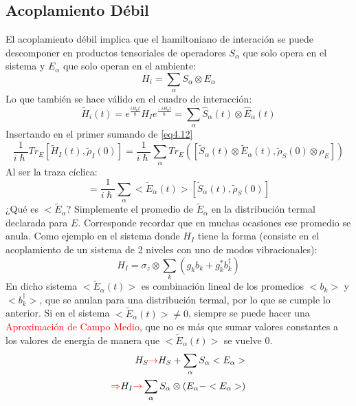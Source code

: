 \documentclass{book}
\begin{document}
\subsection{Acoplamiento Débil} 
El acoplamiento débil implica que el hamiltoniano de interación se puede descomponer en productos tensoriales de operadores $S_\alpha$ que solo opera en el sistema y $E_\alpha$ que solo operan en el ambiente:
\begin{equation}\label{eq4.13}H_i=\sum_\alpha S_\alpha\otimes E_\alpha\end{equation}
Lo que también se hace válido en el cuadro de interacción:
\begin{equation}\label{eq4.14}\tilde{H}_i(t)=e^{\frac{iH_0t}{\hslash}}H_Ie^{\frac{-iH_0t}{\hslash}}=\sum_\alpha \hat{S}_\alpha (t)\otimes \hat{E}_\alpha(t) \end{equation}
Insertando en el primer sumando de \ref{eq4.12} 
\begin{equation}\label{eq4.15}\frac{1}{i\hslash}Tr_E[\tilde{H}_I(t),\tilde{\rho}_I(0)]=\frac{1}{i\hslash}\sum_\alpha Tr_E ([\tilde{S}_\alpha(t)\otimes\tilde{E}_\alpha(t),\tilde{\rho}_S(0)\otimes\rho_E])\end{equation}
Al ser la traza cíclica:
\begin{equation}\label{eq4.16}=\frac{1}{i\hslash}
\sum_\alpha <\tilde{E}_\alpha(t)>[\tilde{S}_\alpha(t),\tilde{\rho}_S(0)]\end{equation}
¿Qué es $<\tilde{E}_\alpha$? Simplemente el promedio de $\tilde{E}_\alpha$ en la distribución termal declarada para $E$. Corresponde recordar que en muchas ocasiones ese promedio se anula. Como ejemplo en el sistema donde $H_I$ tiene la forma (consiste en el acoplamiento de un sistema de 2 niveles con uno de modos vibracionales):
\begin{equation}\label{eq4.17}H_I=\sigma_z\otimes\sum_k(g_kb_k+g_k^*b_k^\dag)\end{equation}
En dicho sistema $<\tilde{E}_\alpha(t)>$ es combinación lineal de los promedios $<b_k>$ y $<b_k^\dag>$, que se anulan para una distribución termal, por lo que se cumple lo anterior.
Si en el sistema $<\tilde{E}_\alpha(t)>\neq 0$, siempre se puede hacer una \textcolor{red}{Aproximación de Campo Medio}, que no es más que sumar valores constantes a los valores de energía de manera que $<\tilde{E}_\alpha(t)>$ se vuelve $0$.
\begin{equation}\label{eq4.18}\begin{aligned}H_S \textcolor{red}{\rightarrow} H_S+\sum_\alpha S_\alpha<E_\alpha>\\ \textcolor{red}{\Rightarrow} H_I\textcolor{red}{\rightarrow} \sum_\alpha S_\alpha\otimes(E_\alpha-<E_\alpha>)\end{aligned}\end{equation}
\end{document}
